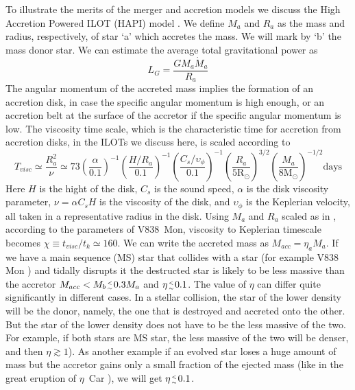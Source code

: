 \documentclass[modern]{aastex62}
\newcommand{\Rsun}{\mathrm{R}_\odot}
\newcommand{\Msun}{\mathrm{M}_\odot}
\newcommand{\lesim}{\genfrac{}{}{0pt}{2}{<}{\sim}}
\begin{document}
To illustrate the merits of the merger and accretion models we discuss the High Accretion Powered ILOT (HAPI) model \citep{2016RAA....16...99K}.
We define $M_a$ and $R_a$ as the mass and radius, respectively, of star `a’ which accretes the mass. We will mark by `b’ the mass donor star.
We can estimate the average total gravitational power as
\begin{equation} 
L_G=\frac{ G M_a \dot M_a }{R_a}
\end{equation}
The angular momentum of the accreted mass implies the formation of an accretion disk, in case the specific angular momentum is high enough, or an accretion belt at the surface of the accretor if the specific angular momentum is low.
The viscosity time scale, which is the characteristic time for accretion from accretion disks, in the ILOTs we discuss here, is scaled according to
\begin{equation} 
T_{visc}\simeq \frac{R^2_a}{\nu} \simeq 73 \left(\frac{\alpha}{0.1}\right)^{-1} \left(\frac{H/R_a}{0.1}\right)^{-1} \left(\frac{C_s/\upsilon_\phi}{0.1}\right) ^{-1} \left(\frac{R_a}{5\Rsun}\right)^{3/2} \left(\frac{M_a}{8 \Msun}\right)^{-1/2} \text{days}
\end{equation}
Here $H$ is the hight of the disk, $C_s$ is the sound speed, $\alpha$ is the disk viscosity parameter, $\nu=\alpha C_s H$ is the viscosity of the disk, and $\upsilon_\phi$ is the Keplerian velocity, all taken in a representative radius in the disk. 
Using $M_a$ and $R_a$ scaled as in \cite{2005A&A...441.1099T}, according to the parameters of V838~Mon, viscosity to Keplerian timescale becomes $\chi \equiv t_{visc}/t_k\simeq 160$. 
We can write the accreted mass as $M_{acc}=\eta_a M_a$.
If we have a main sequence (MS) star that collides with a star (for example V838 Mon \cite{2006A&A...451..223T}) and tidally disrupts it the destructed star is likely to be less massive than the accretor $M_{acc} < M_b \lesim 0.3M_a$ and $\eta\lesim 0.1$.
The value of $\eta$ can differ quite significantly in different cases.
In a stellar collision, the star of the lower density will be the donor, namely, the one that is destroyed and accreted onto the other. But the star of the lower density does not have to be the less massive of the two.
For example, if both stars are MS star, the less massive of the two will be denser, and then  $\eta \gtrsim 1$). 
As another example if an evolved star loses a huge amount of mass but the accretor gains only a small fraction of the ejected mass (like in the great eruption of $\eta$~Car \cite{2008NewA...13..569K}), we will get $\eta\lesim 0.1$. 
\end{document}
